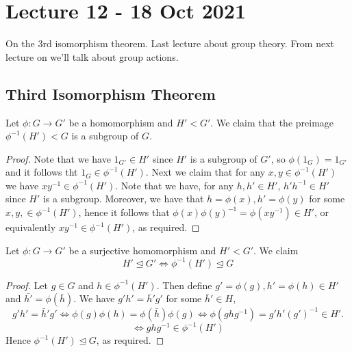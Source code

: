 \section{Lecture 12 - 18 Oct 2021}
On the 3rd isomorphism theorem. Last lecture about group theory. From next lecture on
we'll talk about group actions. 
\subsection{Third Isomorphism Theorem}
\begin{lemma}[Sheet 2, Q5]
  Let $\phi:G\to G'$ be a homomorphism and $H'<G'$. We claim that the preimage
  $\phi^{-1}(H')<G$ is a subgroup of $G$. 
  \label{lem:preImgSubgroup}
\end{lemma}
\begin{proof}
  Note that we have $1_{G'}\in H'$ since $H'$ is a subgroup of $G'$, so
  $\phi(1_{G})=1_{G'}$ and it follows tht $1_{G}\in \phi^{-1}(H')$. Next we claim that for
  any $x,y\in\phi^{-1}(H')$ we have $xy^{-1}\in\phi^{-1}(H')$. Note that we have, for any
  $h,h'\in H'$, $h'h^{-1}\in H'$ since $H'$ is a subgroup. Moreover, we have that
  $h=\phi(x),h'=\phi(y)$ for some $x,y,\in\phi^{-1}(H')$, hence it follows that
  $\phi(x)\phi(y)^{-1} = \phi(xy^{-1})\in H'$, or equivalently $xy^{-1}\in\phi^{-1}(H')$,
  as required.
\end{proof}

\begin{lemma}
  Let $\phi:G\to G'$ be a surjective homomorphism and $H'<G'$. We claim 
  \[H'\trianglelefteq G' \iff \phi^{-1}(H')\trianglelefteq G\]
  \label{lem:preImgNormSub}
\end{lemma}
\begin{proof}
  Let $g\in G$ and $h\in \phi^{-1}(H')$. Then define $g'=\phi(g), h'=\phi(h)\in H'$ and $\bar{h'} = \phi(\bar{h})$.
  We have $g'h' = \bar{h}'g'$ for some $\bar{h}'\in H$,
  \[g'h' = \bar{h}'g' \iff \phi(g)\phi(h)  =\phi(\bar{h})\phi(g) \iff \phi(ghg^{-1}) = g'h'(g')^{-1} \in H'.\]
  \[\iff ghg^{-1}\in \phi^{-1}(H')\]
  Hence $\phi^{-1}(H')\trianglelefteq G$, as required.
\end{proof}

